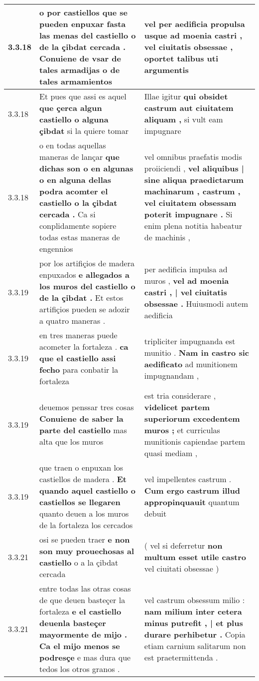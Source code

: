 \begin{tabular}{|p{1cm}|p{6.5cm}|p{6.5cm}|}
3.3.18 & o por castiellos que se pueden enpuxar \textbf{ fasta las menas del castiello o de la çibdat cercada . } Conuiene de vsar de tales armadijas o de tales armamientos & vel per aedificia propulsa usque ad moenia castri , \textbf{ vel ciuitatis obsessae , } oportet talibus uti argumentis \\\hline
3.3.18 & Et pues que assi es aquel \textbf{ que çerca algun castiello o alguna çibdat } si la quiere tomar & Illae igitur \textbf{ qui obsidet castrum aut ciuitatem aliquam , } si vult eam impugnare \\\hline
3.3.18 & o en todas aquellas maneras de lançar \textbf{ que dichas son o en algunas o en alguna dellas podra acomter el castiello o la çibdat cercada . } Ca si conplidamente sopiere todas estas maneras de engennios & vel omnibus praefatis modis proiiciendi , \textbf{ vel aliquibus | sine aliqua praedictarum machinarum , castrum , vel ciuitatem obsessam poterit impugnare . } Si enim plena notitia habeatur de machinis , \\\hline
3.3.19 & por los artifiçios de madera enpuxados \textbf{ e allegados a los muros del castiello o de la çibdat . } Et estos artifiçios pueden se adozir a quatro maneras . & per aedificia impulsa ad muros , \textbf{ vel ad moenia castri , | vel ciuitatis obsessae . } Huiusmodi autem aedificia \\\hline
3.3.19 & en tres maneras puede acometer la fortaleza . \textbf{ ca que el castiello assi fecho } para conbatir la fortaleza & tripliciter impugnanda est munitio . \textbf{ Nam in castro sic aedificato } ad munitionem impugnandam , \\\hline
3.3.19 & deuemos penssar tres cosas \textbf{ Conuiene de saber la parte del castiello } mas alta que los muros & est tria considerare , \textbf{ videlicet partem superiorum excedentem muros ; } et curriculas munitionis capiendae partem quasi mediam , \\\hline
3.3.19 & que traen o enpuxan los castiellos de madera . \textbf{ Et quando aquel castiello o castiellos se llegaren } quanto deuen a los muros de la fortaleza los cercados & vel impellentes castrum . \textbf{ Cum ergo castrum illud appropinquauit } quantum debuit \\\hline
3.3.21 & osi se pueden traer \textbf{ e non son muy prouechosas al castiello } o a la çibdat cercada & ( vel si deferretur \textbf{ non multum esset utile castro } vel ciuitati obsessae ) \\\hline
3.3.21 & entre todas las otras cosas de que deuen basteçer la fortaleza \textbf{ e el castiello deuenla basteçer mayormente de mijo . Ca el mijo menos se podresçe } e mas dura que tedos los otros granos . & vel castrum obsessum milio : \textbf{ nam milium inter cetera minus putrefit , | et plus durare perhibetur . } Copia etiam carnium salitarum non est praetermittenda . \\\hline

\end{tabular}
